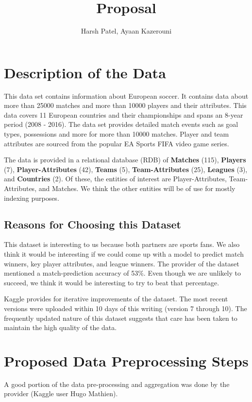\documentclass[11pt, letterpaper]{article}
\begin{document}
\title{Proposal}
\author{Harsh Patel, Ayaan Kazerouni}
\date{}
\maketitle

\section*{Description of the Data}
This data set contains information about European soccer.
It contains data about more than 25000 matches and more than 10000 players and their attributes.
This data covers 11 European countries and their championships and spans an 8-year period (2008 - 2016).
The data set provides detailed match events such as goal types, possessions and more for more than 10000 matches.
Player and team attributes are sourced from the popular EA Sports FIFA video game series.


The data is provided in a relational database (RDB) of \textbf{Matches} (115), \textbf{Players} (7), \textbf{Player-Attributes} (42), \textbf{Teams} (5), \textbf{Team-Attributes} (25), \textbf{Leagues} (3), and \textbf{Countries} (2).
Of these, the entities of interest are Player-Attributes, Team-Attributes, and Matches.
We think the other entities will be of use for mostly indexing purposes.

\subsection*{Reasons for Choosing this Dataset}
This dataset is interesting to us because both partners are sports fans.
We also think it would be interesting if we could come up with a model to predict match winners, key player attributes, and league winners.
The provider of the dataset mentioned a match-prediction accuracy of 53\%.
Even though we are unlikely to succeed, we think it would be interesting to try to beat that percentage.

Kaggle provides for iterative improvements of the dataset.
The most recent versions were uploaded within 10 days of this writing (version 7 through 10).
The frequently updated nature of this dataset suggests that care has been taken to maintain the high quality of the data.

\section*{Proposed Data Preprocessing Steps}
A good portion of the data pre-processing and aggregation was done by the provider (Kaggle user Hugo Mathien).
\end{document}
